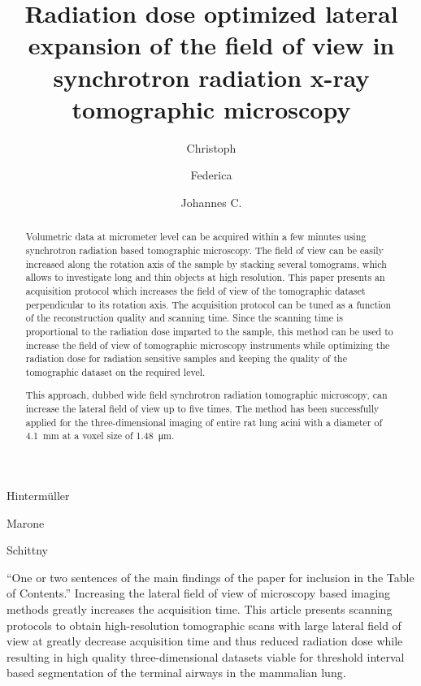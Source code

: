 \documentclass[preprint,s]{iucr}
\begin{document}
\title{Radiation dose optimized lateral expansion of the field of view in synchrotron radiation x-ray tomographic microscopy}

\author[b]{Christoph}{Hinterm\"{u}ller}{}{}
\author[b]{Federica}{Marone}{}{}
\author[a]{Johannes C.}{Schittny}{}{}



\maketitle

\begin{synopsis}
``One or two sentences of the main findings of the paper for inclusion in the Table of Contents.''
Increasing the lateral field of view of microscopy based imaging methods greatly increases the acquisition time. This article presents scanning protocols to obtain high-resolution tomographic scans with large lateral field of view at greatly decrease acquisition time and thus reduced radiation dose while resulting in high quality three-dimensional datasets viable for threshold interval based segmentation of the terminal airways in the mammalian lung.
\end{synopsis}

\begin{abstract}
Volumetric data at micrometer level can be acquired within a few minutes using synchrotron radiation based tomographic microscopy. The field of view can be easily increased along the rotation axis of the sample by stacking several tomograms, which allows to investigate long and thin objects at high resolution. This paper presents an acquisition protocol which increases the field of view of the tomographic dataset perpendicular to its rotation axis. The acquisition protocol can be tuned as a function of the reconstruction quality and scanning time. Since the scanning time is proportional to the radiation dose imparted to the sample, this method can be used to increase the field of view of tomographic microscopy instruments while optimizing the radiation dose for radiation sensitive samples and keeping the quality of the tomographic dataset on the required level.

This approach, dubbed wide field synchrotron radiation tomographic microscopy, can increase the lateral field of view up to five times. The method has been successfully applied for the three-dimensional imaging of entire rat lung acini with a diameter of \SI{4.1}{\milli\meter} at a voxel size of \SI{1.48}{\micro\meter}.
\end{abstract}
\end{document}
